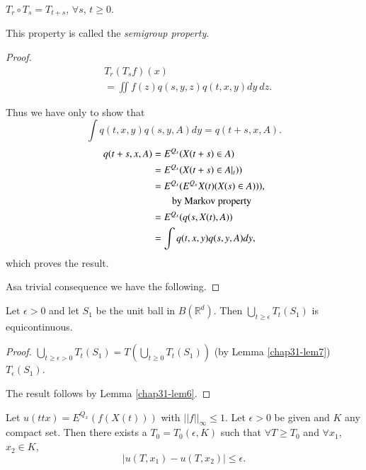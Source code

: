 \begin{lemma}\label{chap31-lem7}
$T_{r}\circ T_{s}=T_{t+s}$, $\forall s$, $t\geq 0$.
\end{lemma}

\begin{remark*}
This property is called the {\em semigroup property}. 
\end{remark*}

\begin{proof}
\begin{align*}
& T_{r}(T_{s}f)(x)\\
& =\iint f(z)q(s,y,z)q(t,x,y)dy\ dz.
\end{align*}

Thus we have only to show that
$$
\int q(t,x,y)q(s,y,A)dy=q(t+s,x,A).
$$
\begin{align*}
q(t+s,x,A) &= E^{Q_{x}}(X(t+s)\in A)\\
&= E^{Q_{x}}(X(t+s)\in A|_{t}))\\
&= E^{Q_{x}}(E^{Q_{x}}X(t)(X(s)\in A))),\\
&\qquad \text{by Markov property}\\
&= E^{Q_{x}}(q(s,X(t),A))\\
&= \int q(t,x,y)q(s,y,A)dy,
\end{align*}
which proves the result.

As\pageoriginale a trivial consequence we have the following.
\end{proof}

\begin{lemma}\label{chap31-lem8}
Let $\epsilon>0$ and let $S_{1}$ be the unit ball in
$B(\mathbb{R}^{d})$. Then $\bigcup\limits_{t\geq
  \epsilon}T_{t}(S_{1})$ is equicontinuous.
\end{lemma}

\begin{proof}
$\bigcup\limits_{t\geq \epsilon>0}T_{t}(S_{1})=T(\bigcup\limits_{t\geq
    0}T_{t}(S_{1}))$ (by Lemma \ref{chap31-lem7})
  $T_{\epsilon}(S_{1})$. 

The result follows by Lemma \ref{chap31-lem6}.
\end{proof}

\begin{lemma}\label{chap31-lem9}
Let $u(ttx)=E^{Q_{x}}(f(X(t)))$ with $||f||_{\infty}\leq 1$. Let
$\epsilon>0$ be given and $K$ any compact set. Then there exists a
$T_{0}=T_{0}(\epsilon,K)$ such that $\forall T\geq T_{0}$ and $\forall
x_{1}$, $x_{2}\in K$,
$$
|u(T,x_{1})-u(T,x_{2})|\leq \epsilon.
$$
\end{lemma}

